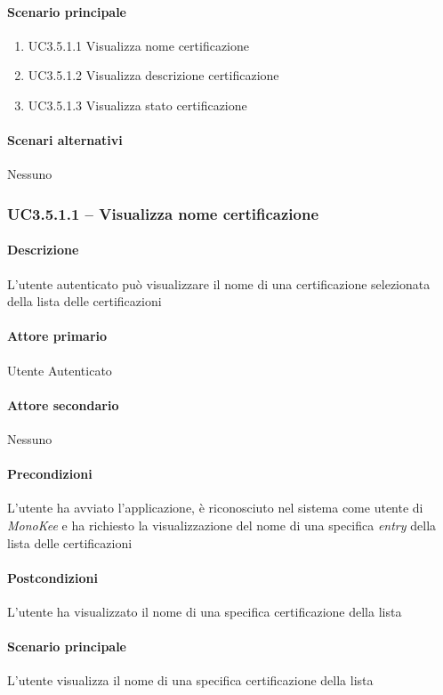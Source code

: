 \paragraph{Scenario principale}  
    \begin{enumerate}
        \item UC3.5.1.1 Visualizza nome certificazione
        \item UC3.5.1.2 Visualizza descrizione certificazione
        \item UC3.5.1.3 Visualizza stato certificazione
    \end{enumerate}
\paragraph{Scenari alternativi}  Nessuno




\subsubsection{UC3.5.1.1 – Visualizza nome certificazione}
\paragraph{Descrizione}  L’utente autenticato può visualizzare il nome di una certificazione selezionata della lista delle certificazioni
\paragraph{Attore primario}  Utente Autenticato
\paragraph{Attore secondario}  Nessuno
\paragraph{Precondizioni} L’utente ha avviato l’applicazione, è riconosciuto nel sistema come utente di \textit{MonoKee} e ha richiesto la visualizzazione del nome di una specifica \textit{entry} della lista delle certificazioni
\paragraph{Postcondizioni}  L’utente ha visualizzato il nome di una specifica certificazione della lista
\paragraph{Scenario principale}  
L’utente visualizza il nome di una specifica certificazione della lista
